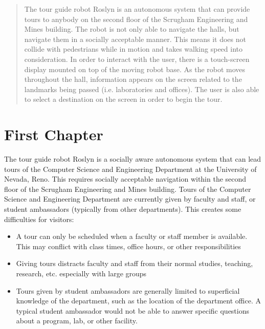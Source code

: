 \documentclass[11pt]{report}
\begin{document}
\begin{preface}
\begin{singlespace}
\end{singlespace}



\pagebreak

\begin{abstract}

The tour guide robot Roslyn is an autonomous system that can provide tours to anybody on the second floor of the Scrugham Engineering and Mines building. The robot is not only able to navigate the halls, but navigate them in a socially acceptable manner. This means it does not collide with pedestrians while in motion and takes walking speed into consideration. In order to interact with the user, there is a touch-screen display mounted on top of the moving robot base. As the robot moves throughout the hall, information appears on the screen related to the landmarks being passed (i.e. laboratories and offices). The user is also able to select a destination on the screen in order to begin the tour.

\end{abstract}




\end{preface}


\chapter{First Chapter}

The tour guide robot Roslyn is a socially aware autonomous system that can lead tours of the Computer Science and Engineering Department at the University of Nevada, Reno. This requires socially acceptable navigation within the second floor of the Scrugham Engineering and Mines building.
Tours of the Computer Science and Engineering Department are currently given by faculty and staff, or student ambassadors (typically from other departments). This creates some difficulties for visitors:
\begin{itemize}
 \item A tour can only be scheduled when a faculty or staff member is available. This may conflict with class times, office hours, or other responsibilities
 \item Giving tours distracts faculty and staff from their normal studies, teaching, research, etc. especially with large groups
 \item Tours given by student ambassadors are generally limited to superficial knowledge of the department, such as the location of the department office. A typical student ambassador would not be able to answer specific questions about a program, lab, or other facility. 
\end{itemize}
\end{document}
